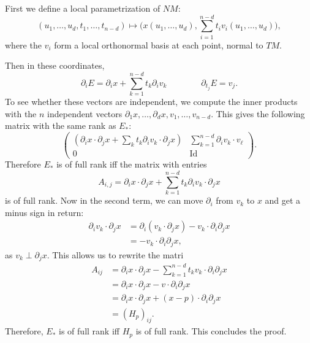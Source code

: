 \begin{myproof}
    First we define a local parametrization of $NM$:
    \[
        (u_1, \ldots, u_d, t_1, \ldots, t_{n-d}) \mapsto \Big(x(u_1, \ldots, u_d), \sum_{i=1}^{n-d} t_i v_i(u_1, \ldots, u_{d})\Big)
    ,\] 
    where the $v_i$ form a local orthonormal basis at each point, normal to $TM$.
\begin{marginfigure}
    \centering
    \caption{Parametrization of the normal bundle of $M$.}
    \label{fig:abundance-of-morse-functions-parametrization-of-the-normal-bundle}
\end{marginfigure}
    Then in these coordinates,
    \[
        \partial_i E = \partial_i x  + \sum_{k=1}^{n-d} t_k \partial_i v_k 
        \qquad
        \qquad
        \partial_{t_j} E  = v_j
    .\]
    To see whether these vectors are independent, we compute the inner products with the $n$ independent vectors $\partial_1 x , \ldots, \partial_d x , v_1, \ldots, v_{n-d}$. 
    This gives the following matrix with the same rank as $E_*$:
     \[
    \begin{pmatrix}
        (\partial_i x\cdot \partial_j x + \sum_k t_k \partial_iv_{k} \cdot \partial_j x) &  \sum_{k=1}^{n-d} \partial_i v_{k} \cdot  v_\ell\\
        0 & \operatorname{Id}
    \end{pmatrix}
    .\] 
    Therefore $E_*$ is of full rank iff the matrix with entries
    \[
        A_{i, j} = \partial_i x\cdot \partial_j x + \sum_{k=1}^{n-d} t_k \partial_iv_{k} \cdot \partial_j x \]  is of full rank.
    Now in the second term, we can move $\partial_i$ from $v_k$ to $x$ and get a minus sign in return:
    \begin{align*}
        \partial_iv_{k} \cdot \partial_j x &= \partial_i (v_k \cdot \partial_j x)  - v_k \cdot  \partial_i \partial_j x\\
                               &= - v_k \cdot  \partial_i \partial_j x
    ,\end{align*} 
    as $v_k \perp \partial_j x$.
    This allows us to rewrite the matri
    \begin{align*}
        A_{ij} &=  \partial_i x\cdot \partial_j x - \sum_{k=1}^{n-d} t_k v_{k} \cdot \partial_i \partial_j x  \\
        &= \partial_i x\cdot \partial_j x - v \cdot \partial_i \partial_j x  \\
        &= \partial_i x\cdot \partial_j x + (x-p) \cdot \partial_i \partial_j x  \\
        &= (H_p)_{ij}
    .\end{align*} 
    Therefore, $E_*$ is of full rank iff $H_p$ is of full rank.
    This concludes the proof.
\end{myproof}

